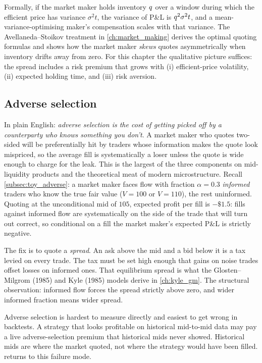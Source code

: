 Formally, if the market maker holds inventory $q$ over a window
during which the efficient price has variance $\sigma^2 t$, the
variance of P\&L is $q^2 \sigma^2 t$, and a
mean-variance-optimising maker's compensation scales with that
variance. The Avellaneda--Stoikov treatment in
\cref{ch:market_making} derives the optimal quoting formulas and
shows how the market maker \emph{skews} quotes asymmetrically when
inventory drifts away from zero. For this chapter the qualitative
picture suffices: the spread includes a risk premium that grows
with (i) efficient-price volatility, (ii) expected holding time,
and (iii) risk aversion.

\subsection{Adverse selection}
\label{subsec:adverse_selection}

In plain English: \emph{adverse selection is the cost of getting
picked off by a counterparty who knows something you don't}. A
market maker who quotes two-sided will be preferentially hit by
traders whose information makes the quote look mispriced, so the
average fill is systematically a loser unless the quote is wide
enough to charge for the leak. This is the largest of the three
components on mid-liquidity products and the theoretical meat of
modern microstructure. Recall
\cref{subsec:toy_adverse}: a market maker faces flow with fraction
$\alpha = 0.3$ \emph{informed} traders who know the true fair value
($V = 100$ or $V = 110$), the rest uninformed. Quoting at the
unconditional mid of $105$, expected profit per fill is $-\$1.5$:
fills against informed flow are systematically on the side of the
trade that will turn out correct, so conditional on a fill the
market maker's expected P\&L is strictly negative.

The fix is to quote a \emph{spread}. An ask above the mid and a
bid below it is a tax levied on every trade. The tax must be set
high enough that gains on noise trades offset losses on informed
ones. That equilibrium spread is what the Glosten--Milgrom (1985)
and Kyle (1985) models derive in \cref{ch:kyle_gm}. The structural
observation: informed flow forces the spread strictly above zero,
and wider informed fraction means wider spread.

Adverse selection is hardest to measure directly and easiest to
get wrong in backtests. A strategy that looks profitable on
historical mid-to-mid data may pay a live adverse-selection
premium that historical mids never showed. Historical mids are
where the market quoted, not where the strategy would have been
filled.  returns to this failure mode.

